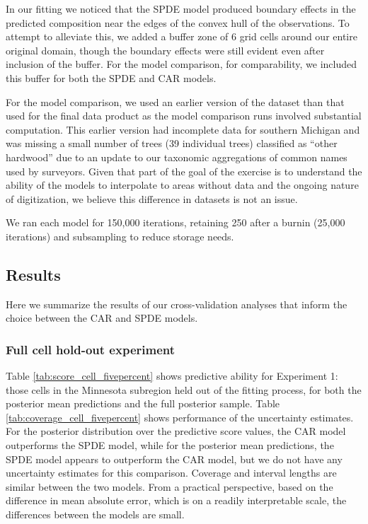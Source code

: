 \documentclass[12pt]{article}\usepackage[]{graphicx}\usepackage[]{color}
\begin{document}
In our fitting we noticed that the SPDE model produced boundary effects
in the predicted composition near the edges of the convex hull of
the observations. To attempt to alleviate this, we added a buffer
zone of 6 grid cells around our entire original domain, though the
boundary effects were still evident even after inclusion of the buffer.
For the model comparison, for comparability, we included this buffer
for both the SPDE and CAR models. 

For the model comparison, we used an earlier version of the dataset
than that used for the final data product as the model comparison
runs involved substantial computation. This earlier version had incomplete
data for southern Michigan and was missing a small number of trees
(39 individual trees) classified as ``other hardwood'' due to an
update to our taxonomic aggregations of common names used by surveyors.
Given that part of the goal of the exercise is to understand the ability
of the models to interpolate to areas without data and the ongoing
nature of digitization, we believe this difference in datasets is
not an issue.

We ran each model for 150,000 iterations, retaining 250 after a burnin
(25,000 iterations) and subsampling to reduce storage needs. 





\subsection{Results}

Here we summarize the results of our cross-validation analyses that
inform the choice between the CAR and SPDE models. 


\subsubsection{Full cell hold-out experiment}

Table \ref{tab:score_cell_fivepercent} shows predictive ability for
Experiment 1: those cells in the Minnesota subregion held out of the
fitting process, for both the posterior mean predictions and the full
posterior sample. Table \ref{tab:coverage_cell_fivepercent} shows
performance of the uncertainty estimates. For the posterior distribution
over the predictive score values, the CAR model outperforms the SPDE
model, while for the posterior mean predictions, the SPDE model appears
to outperform the CAR model, but we do not have any uncertainty estimates
for this comparison. Coverage and interval lengths are similar between
the two models. From a practical perspective, based on the difference
in mean absolute error, which is on a readily interpretable scale,
the differences between the models are small. 
\end{document}
